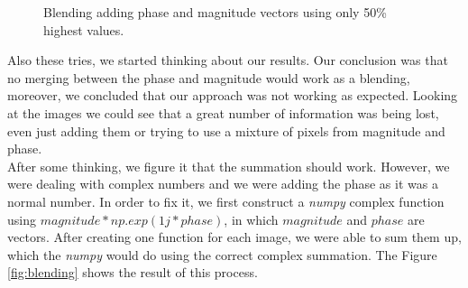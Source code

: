\documentclass[12pt,a4paper]{article}
\begin{document}
\begin{figure}[!h]
	\centering
	{%
		\setlength{\fboxsep}{1pt}%
		\setlength{\fboxrule}{1pt}%
	}%
	\caption{Blending adding phase and magnitude vectors using only 50\% highest values.}
	\label{fig:fourier2}
\end{figure}

Also these tries, we started thinking about our results. Our conclusion was that no merging between the phase and magnitude would work as a blending, moreover, we concluded that our approach was not working as expected. Looking at the images we could see that a great number of information was being lost, even just adding them or trying to use a mixture of pixels from magnitude and phase. \\

After some thinking, we figure it that the summation should work. However, we were dealing with complex numbers and we were adding the phase as it was a normal number. In order to fix it, we first construct a \emph{numpy} complex function using $magnitude * np.exp(1j*phase)$, in which $magnitude$ and $phase$ are vectors. After creating one function for each image, we were able to sum them up, which the \emph{numpy} would do using the correct complex summation. The Figure \ref{fig:blending} shows the result of this process.
\end{document}
